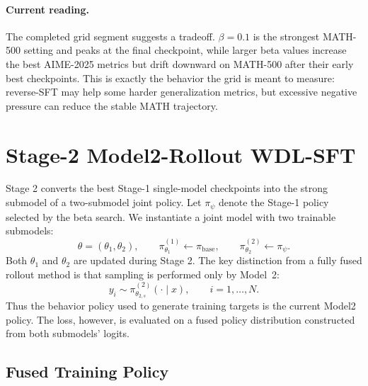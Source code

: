 \paragraph{Current reading.}
The completed grid segment suggests a tradeoff. $\beta=0.1$ is the strongest
MATH-500 setting and peaks at the final checkpoint, while larger beta values
increase the best AIME-2025 metrics but drift downward on MATH-500 after their
early best checkpoints. This is exactly the behavior the grid is meant to
measure: reverse-SFT may help some harder generalization metrics, but excessive
negative pressure can reduce the stable MATH trajectory.

\section{Stage-2 Model2-Rollout WDL-SFT}
\label{sec:stage2-wdl-sft}

Stage 2 converts the best Stage-1 single-model checkpoints into the strong
submodel of a two-submodel joint policy. Let $\pi_{\psi}$ denote the Stage-1
policy selected by the beta search. We instantiate a joint model with two
trainable submodels:
\begin{equation}
    \theta=(\theta_1,\theta_2),
    \qquad
    \pi_{\theta_1}^{(1)} \leftarrow \pi_{\mathrm{base}},
    \qquad
    \pi_{\theta_2}^{(2)} \leftarrow \pi_{\psi}.
    \label{eq:stage2-init}
\end{equation}
Both $\theta_1$ and $\theta_2$ are updated during Stage 2. The key distinction
from a fully fused rollout method is that sampling is performed only by
Model~2:
\begin{equation}
    y_i\sim \pi_{\theta_{2,s}}^{(2)}(\cdot\mid x),
    \qquad i=1,\ldots,N.
    \label{eq:stage2-model2-rollout}
\end{equation}
Thus the behavior policy used to generate training targets is the current
Model2 policy. The loss, however, is evaluated on a fused policy distribution
constructed from both submodels' logits.

\subsection{Fused Training Policy}
\label{sec:stage2-fused-policy}

